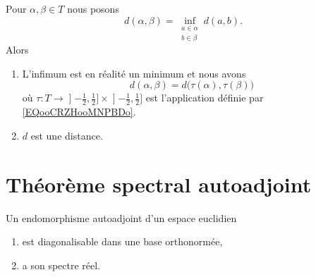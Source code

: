 \begin{theorem}	\label{THOooLTWMooYhkQRj}
	Pour \( \alpha,\beta\in T\) nous posons
	\begin{equation}
		d(\alpha,\beta)=\inf_{\substack{ a\in \alpha \\ b\in \beta }  }d(a,b).
	\end{equation}
	Alors
	\begin{enumerate}
		\item
		      L'infimum est en réalité un minimum et nous avons
		      \begin{equation}
			      d(\alpha,\beta)=d\big( \tau(\alpha),\tau(\beta) \big)
		      \end{equation}
		      où \(\tau \colon T\to \mathopen] -\frac{ 1 }{2},\frac{ 1 }{2}\mathclose]\times \mathopen] -\frac{ 1 }{2},\frac{ 1 }{2}\mathclose]  \) est l'application définie par \ref{EQooCRZHooMNPBDo}.
		\item
		      \( d\) est une distance.
	\end{enumerate}
\end{theorem}


\section{Théorème spectral autoadjoint}

\begin{theorem} \label{ThoRSBahHH}
	Un endomorphisme autoadjoint d'un espace euclidien
	\begin{enumerate}
		\item
		      est diagonalisable dans une base orthonormée,
		\item
		      a son spectre réel.
	\end{enumerate}
\end{theorem}

